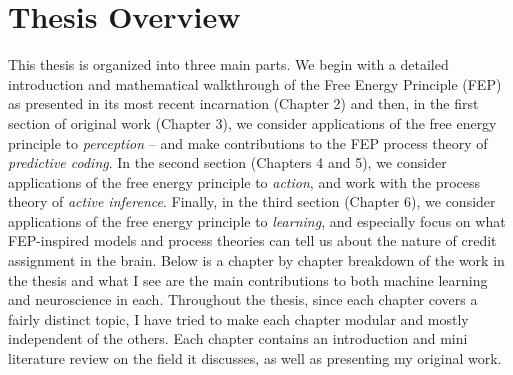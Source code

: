 \section{Thesis Overview}

This thesis is organized into three main parts. We begin with a detailed introduction and mathematical walkthrough of the Free Energy Principle (FEP) as presented in its most recent incarnation \citep{friston2019free,parr2020Markov} (Chapter 2) and then, in the first section of original work (Chapter 3), we consider applications of the free energy principle to \emph{perception} -- and make contributions to the FEP process theory of \emph{predictive coding}. In the second section (Chapters 4 and 5), we consider applications of the free energy principle to \emph{action}, and work with the process theory of \emph{active inference}. Finally, in the third section (Chapter 6), we consider applications of the free energy principle to \emph{learning}, and especially focus on what FEP-inspired models and process theories can tell us about the nature of credit assignment in the brain. Below is a chapter by chapter breakdown of the work in the thesis and what I see are the main contributions to both machine learning and neuroscience in each. Throughout the thesis, since each chapter covers a fairly distinct topic, I have tried to make each chapter modular and mostly independent of the others. Each chapter contains an introduction and mini literature review on the field it discusses, as well as presenting my original work.




